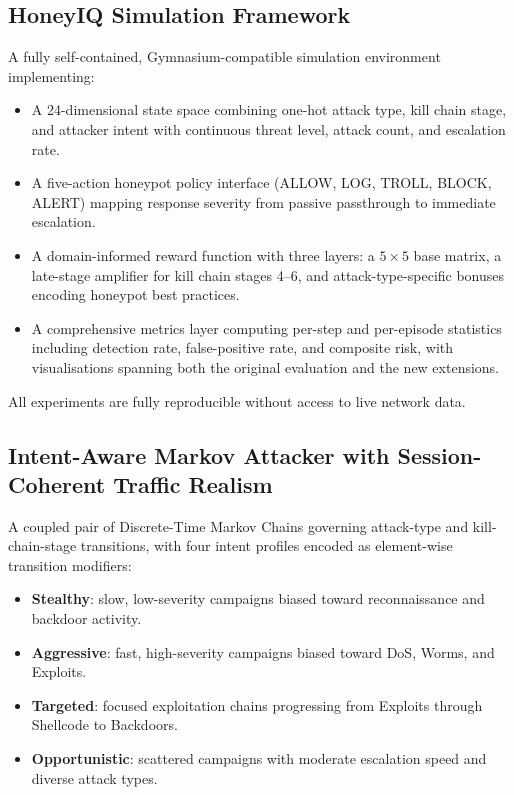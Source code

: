 \subsection{HoneyIQ Simulation Framework}

A fully self-contained, Gymnasium-compatible simulation environment implementing:
%
\begin{itemize}
  \item A 24-dimensional state space combining one-hot attack type, kill chain
        stage, and attacker intent with continuous threat level, attack count,
        and escalation rate.
  \item A five-action honeypot policy interface (ALLOW, LOG, TROLL, BLOCK,
        ALERT) mapping response severity from passive passthrough to immediate
        escalation.
  \item A domain-informed reward function with three layers: a $5 \times 5$
        base matrix, a late-stage amplifier for kill chain stages 4--6, and
        attack-type-specific bonuses encoding honeypot best practices.
  \item A comprehensive metrics layer computing per-step and per-episode
        statistics including detection rate, false-positive rate, and
        composite risk, with visualisations spanning both the original
        evaluation and the new extensions.
\end{itemize}

All experiments are fully reproducible without access to live network data.

\subsection{Intent-Aware Markov Attacker with Session-Coherent Traffic Realism}

A coupled pair of Discrete-Time Markov Chains governing attack-type and
kill-chain-stage transitions, with four intent profiles encoded as element-wise
transition modifiers:
%
\begin{itemize}
  \item \textbf{Stealthy}: slow, low-severity campaigns biased toward
        reconnaissance and backdoor activity.
  \item \textbf{Aggressive}: fast, high-severity campaigns biased toward
        DoS, Worms, and Exploits.
  \item \textbf{Targeted}: focused exploitation chains progressing from
        Exploits through Shellcode to Backdoors.
  \item \textbf{Opportunistic}: scattered campaigns with moderate escalation
        speed and diverse attack types.
\end{itemize}

